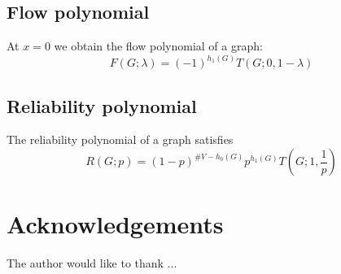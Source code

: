 \documentclass{amsart}
\theoremstyle{definition}
\begin{document}
\subsection{Flow polynomial}
At $x = 0$ we obtain the flow polynomial of a graph:
\begin{equation*}
F(G; \lambda) = (-1)^{h_1(G)} T(G; 0, 1 - \lambda)
\end{equation*}

\subsection{Reliability polynomial}
The reliability polynomial of a graph satisfies
\begin{equation*}
R(G; p) = (1 - p)^{\# V - h_0(G)} p^{h_1(G)} T(G; 1, \frac1p )
\end{equation*}

\section*{Acknowledgements}
The author would like to thank ...


 

\end{document}
